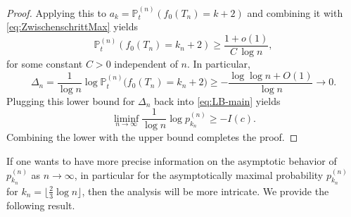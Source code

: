 \documentclass[11pt,a4paper]{article}
\numberwithin{equation}{section}
\def\PP{\mathbb{P}}
\begin{document}
\begin{proof}
	Applying this to $a_k=\PP_t^{(n)}(f_0(T_n)=k+2)$ and combining it with \eqref{eq:ZwischenschrittMax} yields
	\[
	\PP_t^{(n)}(f_0(T_n)=k_n+2)
	\geq\frac{1+o(1)}{C\,\log n},
	\]
	for some constant $C>0$ independent of $n$. In particular,
	\[
	\Delta_n=\frac{1}{\log n}\log \PP_t^{(n)}\!\big(f_0(T_n)=k_n+2\big)\geq-\frac{\log\log n+O(1)}{\log n} \to 0.
	\]
	Plugging this lower bound for $\Delta_n$ back into \eqref{eq:LB-main} yields
	\[
	\liminf_{n\to\infty}\frac{1}{\log n}\log p_{k_n}^{(n)} \geq -I(c).
	\]
	Combining the lower with the upper bound completes the proof.
\end{proof}


If one wants to have more precise information on the asymptotic behavior of $p_{k_n}^{(n)}$ as $n\to \infty$, in particular for the asymptotically maximal probability $p_{k_n}^{(n)}$ for $k_n=\lfloor\frac{2}{3}\log n\rfloor$, then the analysis will be more intricate. We provide the following result.
\end{document}
